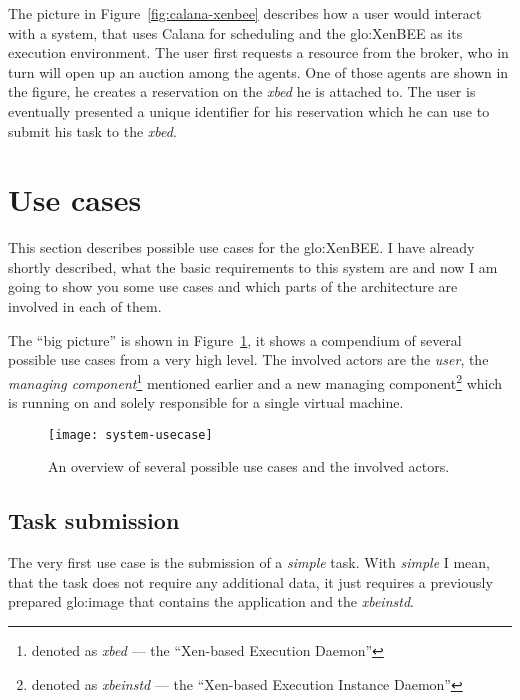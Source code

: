 The picture  in Figure~\ref{fig:calana-xenbee} describes how  a user would
interact  with  a  system,  that   uses  Calana  for  scheduling  and  the
\gls{glo:XenBEE} as  its execution environment. The user  first requests a
resource from  the broker, who in turn  will open up an  auction among the
agents.   One of  those  agents are  shown  in the  figure,  he creates  a
reservation on the \emph{xbed} he  is attached to.  The user is eventually
presented  a unique identifier  for his  reservation which  he can  use to
submit his task to the \emph{xbed}.

\section{Use cases}
\label{sec:use-cases}

This section describes possible use cases for the \gls{glo:XenBEE}. I have
already shortly described, what the  basic requirements to this system are
and now  I am  going to show  you some  use cases and  which parts  of the
architecture are involved in each of them.

The ``big picture'' is shown in Figure~\ref{fig:system-usecases}, it shows
a compendium  of several possible  use cases from  a very high  level. The
involved    actors    are     the    \emph{user},    the    \emph{managing
  component}\footnote{denoted as \emph{xbed} --- the ``Xen-based Execution
  Daemon''}     mentioned      earlier     and     a      new     managing
component\footnote{denoted   as   \emph{xbeinstd}   ---  the   ``Xen-based
  Execution Instance Daemon''} which  is running on and solely responsible
for a single virtual machine.

\begin{figure}[htbp]
  \begin{center}
    \texttt{[image: system-usecase]}
  \end{center}
  \caption[Use case  overview]{An overview  of several possible  use cases
    and the involved actors.}
  \label{fig:system-usecases}
\end{figure}


\subsection{Task submission}
\label{sec:uc-task-submission}

The very  first use case is  the submission of a  \emph{simple} task. With
\emph{simple} I mean, that the  task does not require any additional data,
it just  requires a previously prepared \gls{glo:image}  that contains the
application and the \emph{xbeinstd}.

